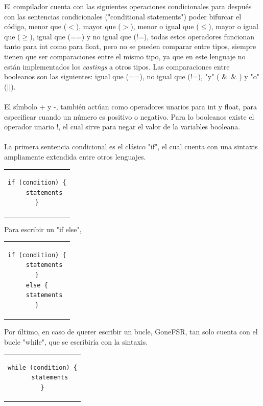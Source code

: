 El compilador cuenta con las siguientes operaciones condicionales para después con las sentencias condicionales ("conditional statements") poder  bifurcar el código, menor que ($<$), mayor que ($>$), menor o igual que ($\leq$), mayor o igual que ($\geq$), igual que (==) y no igual que (!=), todas estos operadores funcionan tanto para int como para float, pero no se pueden comparar entre tipos, siempre tienen que ser comparaciones entre el mismo tipo, ya que en este lenguaje no están implementados los \textit{castings} a otros tipos. Las comparaciones entre booleanos son las siguientes: igual que (==), no igual que (!=), "y" ($\And\And$) y "o" ($||$).\\\\
El símbolo + y -, también actúan como operadores unarios para int y float, para especificar cuando un número es positivo o negativo. Para lo booleanos existe el operador unario !, el cual sirve para negar el valor de la variables booleana. \\\\
\newpage
\noindent La primera sentencia condicional es el clásico "if", el cual cuenta con una sintaxis ampliamente extendida entre otros lenguajes.
\begin{center}
\begin{tabular}{c}
\begin{lstlisting}
if (condition) {
    statements
}
\end{lstlisting}
\end{tabular}
\end{center}
Para escribir un "if else",
\begin{center}
\begin{tabular}{c}
\begin{lstlisting}
if (condition) {
    statements
}
else {
    statements
}
\end{lstlisting}
\end{tabular}
\end{center}
Por último, en caso de querer escribir un bucle, GoneFSR, tan solo cuenta con el bucle "while", que se escribiría con la sintaxis.
\begin{center}
\begin{tabular}{c}
\begin{lstlisting}
while (condition) {
    statements
}
\end{lstlisting}
\end{tabular}
\end{center}
